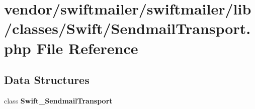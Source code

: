 \section{vendor/swiftmailer/swiftmailer/lib/classes/\+Swift/\+Sendmail\+Transport.php File Reference}
\label{_sendmail_transport_8php}
\subsection*{Data Structures}
\begin{DoxyCompactItemize}
\item 
class {\bf Swift\+\_\+\+Sendmail\+Transport}
\end{DoxyCompactItemize}
